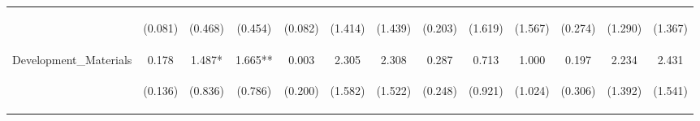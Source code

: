 \begin{tabular}{lcccccccccccc}
 & \begin{footnotesize}(0.081)\end{footnotesize} & \begin{footnotesize}(0.468)\end{footnotesize} & \begin{footnotesize}(0.454)\end{footnotesize} & \begin{footnotesize}(0.082)\end{footnotesize} & \begin{footnotesize}(1.414)\end{footnotesize} & \begin{footnotesize}(1.439)\end{footnotesize} & \begin{footnotesize}(0.203)\end{footnotesize} & \begin{footnotesize}(1.619)\end{footnotesize} & \begin{footnotesize}(1.567)\end{footnotesize} & \begin{footnotesize}(0.274)\end{footnotesize} & \begin{footnotesize}(1.290)\end{footnotesize} & \begin{footnotesize}(1.367)\end{footnotesize}\\
\noalign{\smallskip}Development_Materials & 0.178 & 1.487* & 1.665** & 0.003 & 2.305 & 2.308 & 0.287 & 0.713 & 1.000 & 0.197 & 2.234 & 2.431\\
 & \begin{footnotesize}(0.136)\end{footnotesize} & \begin{footnotesize}(0.836)\end{footnotesize} & \begin{footnotesize}(0.786)\end{footnotesize} & \begin{footnotesize}(0.200)\end{footnotesize} & \begin{footnotesize}(1.582)\end{footnotesize} & \begin{footnotesize}(1.522)\end{footnotesize} & \begin{footnotesize}(0.248)\end{footnotesize} & \begin{footnotesize}(0.921)\end{footnotesize} & \begin{footnotesize}(1.024)\end{footnotesize} & \begin{footnotesize}(0.306)\end{footnotesize} & \begin{footnotesize}(1.392)\end{footnotesize} & \begin{footnotesize}(1.541)\end{footnotesize}\\

\end{tabular}
